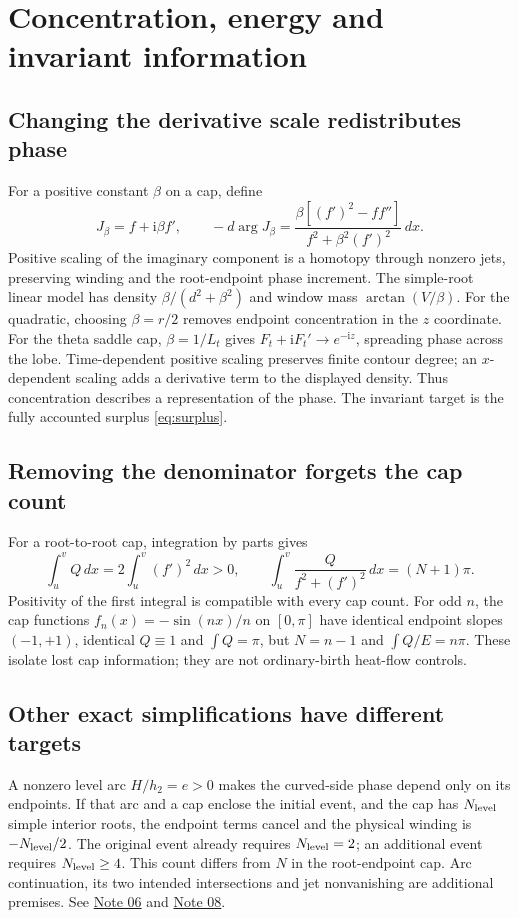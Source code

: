 \documentclass[11pt]{article}
\theoremstyle{definition}
\newcommand{\ii}{\mathrm i}
\begin{document}
\section{Concentration, energy and invariant information}
\label{sec:information}
\subsection{Changing the derivative scale redistributes phase}
For a positive constant \(\beta\) on a cap, define
\[
 J_\beta=f+\ii\beta f',\qquad
 -d\arg J_\beta=\frac{\beta[(f')^2-ff'']}
                     {f^2+\beta^2(f')^2}\,dx.
\]
Positive scaling of the imaginary component is a homotopy through
nonzero jets, preserving winding and the root-endpoint phase increment.
The simple-root linear model has density
\(\beta/(d^2+\beta^2)\) and window mass \(\arctan(V/\beta)\).
For the quadratic, choosing \(\beta=r/2\) removes endpoint concentration
in the \(z\) coordinate. For the theta saddle cap, \(\beta=1/L_t\)
gives \(F_t+\ii F_t'\to e^{-\ii z}\), spreading phase across the lobe.
Time-dependent positive scaling preserves finite contour degree;
an \(x\)-dependent scaling adds a derivative term to the displayed density.
Thus concentration describes a representation of the phase. The
invariant target is the fully accounted surplus \eqref{eq:surplus}.

\subsection{Removing the denominator forgets the cap count}
For a root-to-root cap, integration by parts gives
\[
 \int_u^v Q\,dx=2\int_u^v(f')^2\,dx>0,\qquad
 \int_u^v\frac{Q}{f^2+(f')^2}\,dx=(N+1)\pi.
\]
Positivity of the first integral is compatible with every cap count.
For odd \(n\), the cap functions \(f_n(x)=-\sin(nx)/n\) on \([0,\pi]\)
have identical endpoint slopes \((-1,+1)\), identical \(Q\equiv1\)
and \(\int Q=\pi\), but \(N=n-1\) and \(\int Q/E=n\pi\).
These isolate lost cap information; they are not ordinary-birth
heat-flow controls.

\subsection{Other exact simplifications have different targets}
A nonzero level arc \(H/h_2=e>0\) makes the curved-side phase depend
only on its endpoints. If that arc and a cap enclose the initial
event, and the cap has \(N_{\rm level}\) simple interior roots,
the endpoint terms cancel and the physical winding is
\(-N_{\rm level}/2\). The original event already requires
\(N_{\rm level}=2\); an additional event requires \(N_{\rm level}\ge4\).
This count differs from \(N\) in the root-endpoint cap. Arc continuation,
its two intended intersections and jet nonvanishing are additional
premises. See
\href{../notes/06_HEAT_FLOW_CONTOURS_AND_GAUSSIAN_CAP_ENERGY_20261020.md}{Note 06}
and \href{../notes/08_LOCALIZED_COMPARATOR_AND_LEVEL_CONTROL_20261020.md}{Note 08}.
\end{document}
